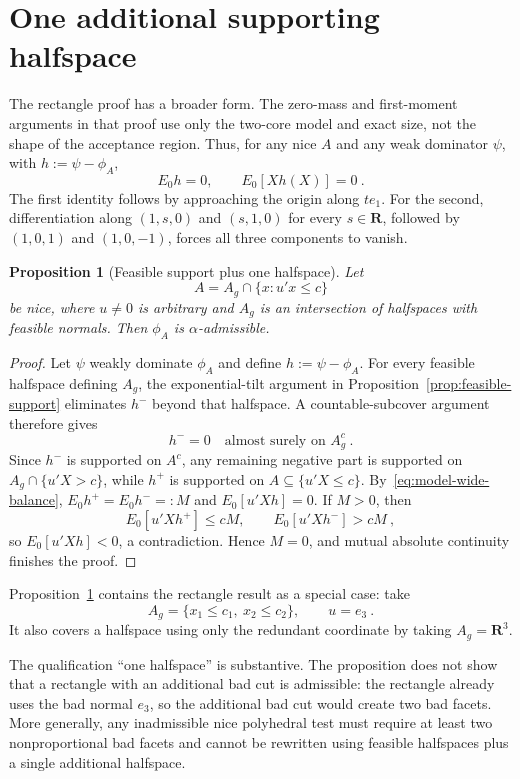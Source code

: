 \documentclass[12pt]{article}
\newtheorem{proposition}{Proposition}
\theoremstyle{remark}
\begin{document}
\section{One additional supporting halfspace}

The rectangle proof has a broader form.  The zero-mass and first-moment
arguments in that proof use only the two-core model and exact size, not the
shape of the acceptance region.  Thus, for any nice $A$ and any weak
dominator $\psi$, with $h:=\psi-\phi_A$,
\begin{equation}\label{eq:model-wide-balance}
E_0h=0,
\qquad
E_0[Xh(X)]=0~.
\end{equation}
The first identity follows by approaching the origin along $t e_1$.  For the
second, differentiation along $(1,s,0)$ and $(s,1,0)$ for every
$s\in\mathbf R$, followed by $(1,0,1)$ and $(1,0,-1)$, forces all three
components to vanish.

\begin{proposition}[Feasible support plus one halfspace]
\label{prop:one-extra-halfspace}
Let
\[
A
=
A_g\cap\{x:u'x\le c\}
\]
be nice, where $u\ne0$ is arbitrary and $A_g$ is an intersection of
halfspaces with feasible normals.  Then $\phi_A$ is $\alpha$-admissible.
\end{proposition}

\begin{proof}
Let $\psi$ weakly dominate $\phi_A$ and define $h:=\psi-\phi_A$.
For every feasible halfspace defining $A_g$, the exponential-tilt argument
in Proposition~\ref{prop:feasible-support} eliminates $h^-$ beyond that
halfspace.  A countable-subcover argument therefore gives
\[
h^-=0\quad\text{almost surely on }A_g^c~.
\]
Since $h^-$ is supported on $A^c$, any remaining negative part is supported
on $A_g\cap\{u'X>c\}$, while $h^+$ is supported on
$A\subseteq\{u'X\le c\}$.  By~\eqref{eq:model-wide-balance},
$E_0h^+=E_0h^-=:M$ and $E_0[u'Xh]=0$.  If $M>0$, then
\[
E_0[u'Xh^+]\le cM,
\qquad
E_0[u'Xh^-]>cM~,
\]
so $E_0[u'Xh]<0$, a contradiction.  Hence $M=0$, and mutual absolute
continuity finishes the proof.
\end{proof}

Proposition~\ref{prop:one-extra-halfspace} contains the rectangle result as
a special case: take
\[
A_g=\{x_1\le c_1,\ x_2\le c_2\},
\qquad
u=e_3~.
\]
It also covers a halfspace using only the redundant coordinate by taking
$A_g=\mathbf R^3$.

The qualification ``one halfspace'' is substantive.  The proposition does
not show that a rectangle with an additional bad cut is admissible: the
rectangle already uses the bad normal $e_3$, so the additional bad cut would
create two bad facets.  More generally, any inadmissible nice polyhedral test
must require at least two nonproportional bad facets and cannot be rewritten
using feasible halfspaces plus a single additional halfspace.
\end{document}
